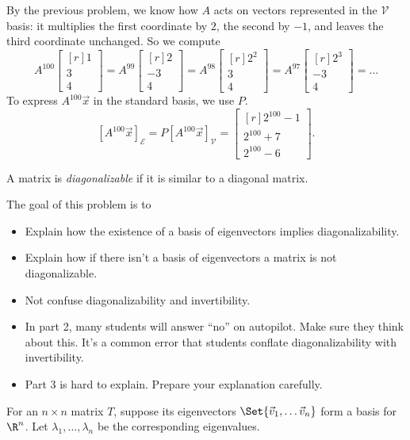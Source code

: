 \documentclass{problemset}
\newcommand{\mat}[1]{\begin{bmatrix*}[r]#1\end{bmatrix*}}
\begin{document}
\begin{parts}
\begin{solution}
				By the previous problem, we know how $A$ acts on vectors represented
				in the $\mathcal V$ basis: it multiplies the first coordinate by
				$2$, the second by $-1$, and leaves the third coordinate unchanged.
				So we compute
				\[
					A^{100}\mat{1\\3\\4}
					=A^{99}\mat{2\\-3\\4}
					=A^{98}\mat{2^2\\3\\4}
					=A^{97}\mat{2^3\\-3\\4}
					=\dots
				\]
				To express $A^{100}\vec x$ in the standard basis, we use $P$.
				\[
					[A^{100}\vec x]_{\mathcal E} = P[A^{100}\vec x]_{\mathcal V} = \mat{2^{100}-1\\2^{100}+7\\2^{100}-6}.
				\]
			\end{solution}
	\end{parts}


	\begin{definition}[Diagonalizable]
		A matrix is \emph{diagonalizable} if it is similar to a diagonal matrix.
	\end{definition}
	\question
	\begin{annotation}
		\begin{goals}

			The goal of this problem is to
			\begin{itemize}
				\item Explain how the existence of a basis of eigenvectors implies diagonalizability.
				\item Explain how if there isn't a basis of eigenvectors a matrix is not diagonalizable.
				\item Not confuse diagonalizability and invertibility.
			\end{itemize}
		\end{goals}

		\begin{notes}
			\begin{itemize}
				\item In part 2, many students will answer ``no'' on autopilot. Make
					sure they think about this. It's a common error that students
					conflate diagonalizability with invertibility.
				\item Part 3 is hard to explain. Prepare your explanation carefully.
			\end{itemize}
		\end{notes}
	\end{annotation}
	For an $n\times n$ matrix $T$, suppose its eigenvectors $\Set{\vec v_1,\ldots \vec v_n}$
	form a basis for $\R^n$.  Let $\lambda_1,\ldots,\lambda_n$ be the corresponding
	eigenvalues.
\end{document}
